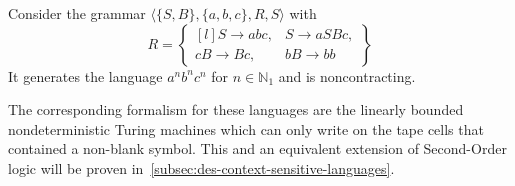 \begin{exmp}
    Consider the grammar $\langle \{S, B\}, \{a, b, c\}, R, S \rangle$ with
    \[
        R = \begin{Bmatrix*}[l]
               S \to abc, &S \to aSBc, \\
               cB \to Bc, &bB \to bb
        \end{Bmatrix*}
    \]
    It generates the language $a^{n}b^{n}c^{n}$ for $n \in \mathbb{N}_{1}$ and is noncontracting.
\end{exmp}

The corresponding formalism for these languages are the linearly bounded nondeterministic Turing machines which can only write on the tape cells that contained a non-blank symbol.
This and an equivalent extension of Second-Order logic will be proven in~\cref{subsec:des-context-sensitive-languages}.
